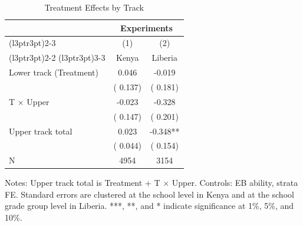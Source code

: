 \begin{table}[H]
\centering
\caption{Treatment Effects by Track}
\label{tab:upper_lower}
\begin{threeparttable}
\begin{tabular}[t]{lcc}
\toprule
\multicolumn{1}{c}{ } & \multicolumn{2}{c}{Experiments} \\
\cmidrule(l{3pt}r{3pt}){2-3}
\multicolumn{1}{c}{ } & \multicolumn{1}{c}{(1)} & \multicolumn{1}{c}{(2)} \\
\cmidrule(l{3pt}r{3pt}){2-2} \cmidrule(l{3pt}r{3pt}){3-3}
 & \multicolumn{1}{c}{Kenya} & \multicolumn{1}{c}{Liberia} \\
\midrule
Lower track (Treatment) &   0.046 &  -0.019 \\
 & (  0.137) & (  0.181) \\
\addlinespace
T $\times$ Upper &  -0.023 &  -0.328 \\
 & (  0.147) & (  0.201) \\
\addlinespace
Upper track total &   0.023 &  -0.348** \\
 & (  0.044) & (  0.154) \\
\addlinespace
N & 4954 & 3154 \\
\bottomrule
\end{tabular}
\begin{tablenotes}[para]
\item Notes: Upper track total is Treatment + T $\times$ Upper. Controls: EB ability, strata FE\@. Standard errors are clustered at the school level in Kenya and at the school grade group level in Liberia. ***, **, and * indicate significance at 1\%, 5\%, and 10\%.
\end{tablenotes}
\end{threeparttable}
\end{table}
